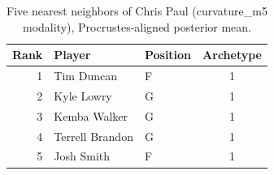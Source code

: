 \begin{table}[htbp]
  \centering\small
  \begin{tabular}{rllc}
    \toprule
    Rank & Player & Position & Archetype \\
    \midrule
    1 & Tim Duncan & F & 1 \\
    2 & Kyle Lowry & G & 1 \\
    3 & Kemba Walker & G & 1 \\
    4 & Terrell Brandon & G & 1 \\
    5 & Josh Smith & F & 1 \\
    \bottomrule
  \end{tabular}
  \caption{Five nearest neighbors of Chris Paul (curvature_m5 modality), Procrustes-aligned posterior mean.}
  \label{tab:Chris_Paul_neighbors_curvature_m5}
\end{table}

